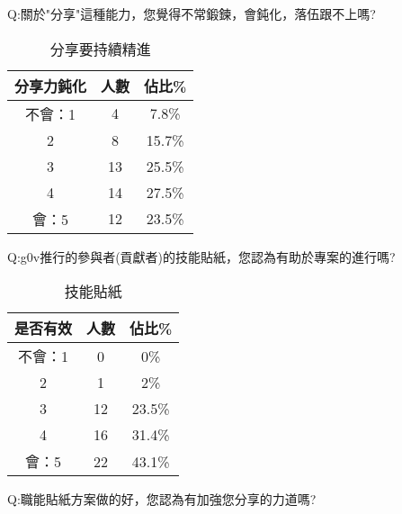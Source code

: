 Q:關於"分享"這種能力，您覺得不常鍛鍊，會鈍化，落伍跟不上嗎?

\begin{center} 
\begin{table}[h]
\centering
\caption{分享要持續精進}
\label{4_1_offen}
\begin{tabular}{ccc} \hline
分享力鈍化&	人數 &	佔比\% \\ \hline
不會：1&	4&	7.8\% \\ \hline
2	&8&	15.7\% \\ \hline
3	&13&	25.5\% \\ \hline
4	&14	&27.5\% \\ \hline
會：5&	12	&23.5\% \\ \hline

\end{tabular}
\end{table}
\end{center}


Q:g0v推行的參與者(貢獻者)的技能貼紙，您認為有助於專案的進行嗎?


\begin{center} 
\begin{table}[h]
\centering
\caption{技能貼紙}
\label{4_1_classify}
\begin{tabular}{ccc} \hline
是否有效&	人數 &	佔比\% \\ \hline
不會：1&	0&	0\% \\ \hline
2	&1	&2\% \\ \hline
3	&12&	23.5\% \\ \hline
4	&16&	31.4\% \\ \hline
會：5&	22&	43.1\% \\ \hline
\end{tabular}
\end{table}
\end{center}



Q:職能貼紙方案做的好，您認為有加強您分享的力道嗎?

